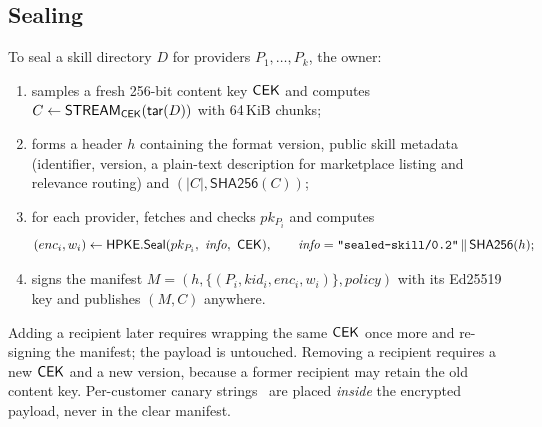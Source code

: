 \subsection{Sealing}
To seal a skill directory $D$ for providers $P_1,\dots,P_k$, the owner:
\begin{enumerate}
  \item samples a fresh 256-bit content key $\mathsf{CEK}$ and computes
  $C \gets \mathsf{STREAM}_{\mathsf{CEK}}(\mathsf{tar}(D))$ with 64\,KiB chunks;
  \item forms a header $h$ containing the format version, public skill metadata (identifier,
  version, a plain-text description for marketplace listing and relevance routing) and
  $(|C|, \mathsf{SHA256}(C))$;
  \item for each provider, fetches and checks $pk_{P_i}$ and computes
  \[ (enc_i, w_i) \gets \mathsf{HPKE.Seal}(pk_{P_i},\ \mathit{info},\ \mathsf{CEK}),
     \qquad \mathit{info} = \texttt{"sealed-skill/0.2"} \,\|\, \mathsf{SHA256}(h); \]
  \item signs the manifest $M = (h, \{(P_i, kid_i, enc_i, w_i)\}, \mathit{policy})$ with its
  Ed25519 key and publishes $(M, C)$ anywhere.
\end{enumerate}
Adding a recipient later requires wrapping the same $\mathsf{CEK}$ once more and re-signing the manifest;
the payload is untouched. Removing a recipient requires a new $\mathsf{CEK}$ and a new version, because a
former recipient may retain the old content key. Per-customer canary strings~\citep{chor1994tracing}
are placed \emph{inside} the encrypted payload, never in the clear manifest.

